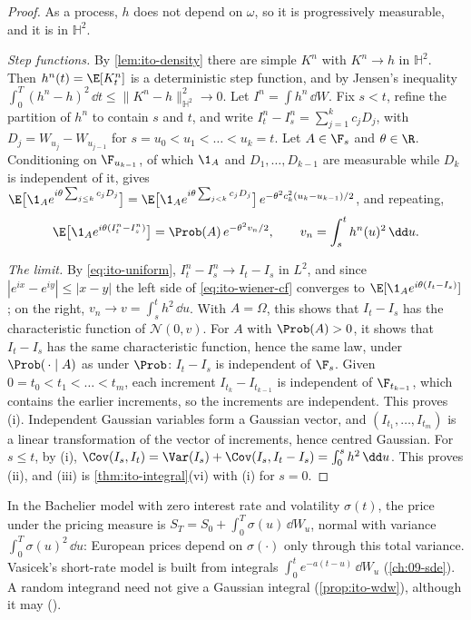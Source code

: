 \begin{proof}
As a process, $h$ does not depend on $\omega$, so it is progressively measurable, and it is
in $\mathbb H^2$.

\emph{Step functions.} By \cref{lem:ito-density} there are simple $K^n$ with $K^n\to h$ in
$\mathbb H^2$. Then $h^n(t)=\E[K^n_t]$ is a deterministic step function, and by Jensen's
inequality $\int_0^T(h^n-h)^2\,\dd t\le\|K^n-h\|_{\mathbb H^2}^2\to0$. Let
$I^n=\int h^n\,\dd W$. Fix $s<t$, refine the partition of $h^n$ to contain $s$ and $t$, and
write $I^n_t-I^n_s=\sum_{j=1}^kc_jD_j$, with $D_j=W_{u_j}-W_{u_{j-1}}$ for
$s=u_0<u_1<\dots<u_k=t$. Let $A\in\F_s$ and $\theta\in\R$. Conditioning on $\F_{u_{k-1}}$, of
which $\1_A$ and $D_1,\dots,D_{k-1}$ are measurable while $D_k$ is independent of it, gives
$\E\big[\1_Ae^{i\theta\sum_{j\le k}c_jD_j}\big]=\E\big[\1_Ae^{i\theta\sum_{j<k}c_jD_j}\big]\,
e^{-\theta^2c_k^2(u_k-u_{k-1})/2}$, and repeating,
\begin{equation}\label{eq:ito-wiener-cf}
  \E\big[\1_Ae^{i\theta(I^n_t-I^n_s)}\big]=\Prob(A)\,e^{-\theta^2v_n/2},\qquad
  v_n=\int_s^th^n(u)^2\,\dd u .
\end{equation}

\emph{The limit.} By \eqref{eq:ito-uniform}, $I^n_t-I^n_s\to I_t-I_s$ in $L^2$, and since
$|e^{ix}-e^{iy}|\le|x-y|$ the left side of \eqref{eq:ito-wiener-cf} converges to
$\E[\1_Ae^{i\theta(I_t-I_s)}]$; on the right, $v_n\to v=\int_s^th^2\,\dd u$. With $A=\Omega$,
this shows that $I_t-I_s$ has the characteristic function of $\mathcal N(0,v)$. For $A$ with
$\Prob(A)>0$, it shows that $I_t-I_s$ has the same characteristic function, hence the same
law, under $\Prob(\,\cdot\mid A)$ as under $\Prob$: $I_t-I_s$ is independent of $\F_s$.
Given $0=t_0<t_1<\dots<t_m$, each increment $I_{t_k}-I_{t_{k-1}}$ is independent of
$\F_{t_{k-1}}$, which contains the earlier increments, so the increments are independent.
This proves (i). Independent Gaussian variables form a Gaussian vector, and
$(I_{t_1},\dots,I_{t_m})$ is a linear transformation of the vector of increments, hence
centred Gaussian. For $s\le t$, by (i), $\Cov(I_s,I_t)=\Var(I_s)+\Cov(I_s,I_t-I_s)=\int_0^sh^2\,\dd u$.
This proves (ii), and (iii) is \cref{thm:ito-integral}(vi) with (i) for $s=0$.
\end{proof}

In the Bachelier model with zero interest rate and volatility $\sigma(t)$, the price under the
pricing measure is $S_T=S_0+\int_0^T\sigma(u)\,\dd W_u$, normal with variance
$\int_0^T\sigma(u)^2\,\dd u$: European prices depend on $\sigma(\cdot)$ only through this total
variance. Vasicek's short-rate model is built from integrals $\int_0^te^{-a(t-u)}\,\dd W_u$
(\cref{ch:09-sde}). A random integrand need not give a Gaussian integral
(\cref{prop:ito-wdw}), although it may ().

